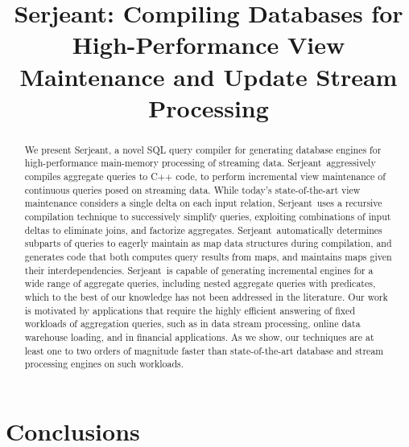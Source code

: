 \documentclass{sig-alternate}
\newcommand{\compiler}{Serjeant}
\begin{document}
\title{Serjeant: Compiling Databases for High-Performance View Maintenance and Update Stream Processing}
\author{
}
\toappear{}
\maketitle

\begin{abstract}
We present \compiler, a novel SQL query compiler for generating database engines
for high-performance main-memory processing of streaming data. \compiler\
aggressively compiles aggregate queries to C++ code, to perform incremental view
maintenance of continuous queries posed on streaming data. While today's
state-of-the-art view maintenance considers a single delta on each input
relation, \compiler\ uses a recursive compilation technique to successively
simplify queries, exploiting combinations of input deltas to eliminate joins,
and factorize aggregates. \compiler\ automatically determines subparts of
queries to eagerly maintain as map data structures during compilation, and
generates code that both computes query results from maps, and maintains maps
given their interdependencies.  \compiler\ is capable of generating incremental
engines for a wide range of aggregate queries, including nested aggregate
queries with predicates, which to the best of our knowledge has not been
addressed in the literature.  Our work is motivated by applications that require
the highly efficient answering of fixed workloads of aggregation queries, such
as in data stream processing, online data warehouse loading, and in financial
applications. As we show, our techniques are at least one to two orders of
magnitude faster than state-of-the-art database and stream processing engines on
such workloads.
\end{abstract}




%




\section{Conclusions}



\end{document}
